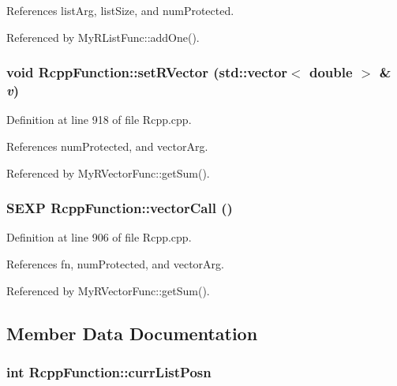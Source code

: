 References listArg, listSize, and numProtected.

Referenced by MyRListFunc::addOne().\hypertarget{classRcppFunction_482df5aa5e2a98d52c9a79cf3ab31c67}{
\subsubsection[{setRVector}]{\setlength{\rightskip}{0pt plus 5cm}void RcppFunction::setRVector (std::vector$<$ double $>$ \& {\em v})}}
\label{classRcppFunction_482df5aa5e2a98d52c9a79cf3ab31c67}




Definition at line 918 of file Rcpp.cpp.

References numProtected, and vectorArg.

Referenced by MyRVectorFunc::getSum().\hypertarget{classRcppFunction_c57c514c761609892ff553434e134446}{
\subsubsection[{vectorCall}]{\setlength{\rightskip}{0pt plus 5cm}SEXP RcppFunction::vectorCall ()}}
\label{classRcppFunction_c57c514c761609892ff553434e134446}




Definition at line 906 of file Rcpp.cpp.

References fn, numProtected, and vectorArg.

Referenced by MyRVectorFunc::getSum().

\subsection{Member Data Documentation}
\hypertarget{classRcppFunction_ce513a92e96b36883b709b5352ea5663}{
\subsubsection[{currListPosn}]{\setlength{\rightskip}{0pt plus 5cm}int {\bf RcppFunction::currListPosn}}}
\label{classRcppFunction_ce513a92e96b36883b709b5352ea5663}




